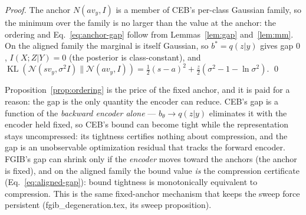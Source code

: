 \begin{proof}
The anchor $N(a v_y, I)$ is a member of CEB's per-class Gaussian family, so the minimum
over the family is no larger than the value at the anchor: the ordering and
Eq.~\eqref{eq:anchor-gap} follow from Lemmas~\ref{lem:gap} and~\ref{lem:mm}.
On the aligned family the marginal is itself Gaussian, so $b^* = q(z|y)$ gives gap $0$,
$I(X;Z|Y) = 0$ (the posterior is class-constant), and
$\operatorname{KL}(\mathcal{N}(s v_y, \sigma^2 I)\|\mathcal{N}(a v_y, I))
= \tfrac{1}{2}(s-a)^2 + \tfrac{z}{2}(\sigma^2-1-\ln\sigma^2)$. \hfill\qed
\end{proof}

\begin{remark}\label{rem:force}
Proposition~\ref{prop:ordering} is the price of the fixed anchor, and it is paid for a
reason: the gap is the only quantity the encoder can reduce. CEB's gap is a function of
the \emph{backward encoder alone} --- $b_\theta \to q(z|y)$ eliminates it with the encoder
held fixed, so CEB's bound can become tight while the representation stays uncompressed:
its tightness certifies nothing about compression, and the gap is an unobservable
optimization residual that tracks the forward encoder. FGIB's gap can shrink only if the
\emph{encoder} moves toward the anchors (the anchor is fixed), and on the aligned family
the bound value \emph{is} the compression certificate (Eq.~\eqref{eq:aligned-gap}): bound
tightness is monotonically equivalent to compression. This is the same fixed-anchor
mechanism that keeps the sweep force persistent (fgib\_degeneration.tex, its sweep proposition).
\end{remark}

